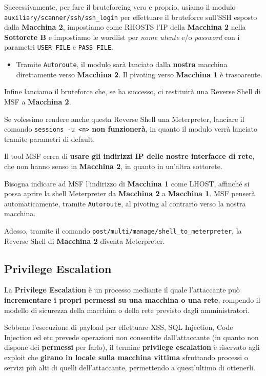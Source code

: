 \documentclass{article}
\begin{document}
Successivamente, per fare il bruteforcing vero e proprio, usiamo il modulo \verb|auxiliary/scanner/ssh/ssh_login| per effettuare il bruteforce sull'SSH esposto dalla \textbf{Macchina 2}, impostiamo come RHOSTS l'IP della \textbf{Macchina 2} nella \textbf{Sottorete B} e impostiamo le wordlist per \textit{nome utente} e/o \textit{password} con i parametri
\verb|USER_FILE| e \verb|PASS_FILE|.
\begin{itemize}
	\item Tramite \verb|Autoroute|, il modulo sarà lanciato dalla \textbf{nostra} macchina direttamente verso \textbf{Macchina 2}. Il pivoting verso \textbf{Macchina 1} è trasoarente.
\end{itemize}

Infine lanciamo il bruteforce che, se ha successo, ci restituirà una Reverse Shell di MSF a \textbf{Macchina 2}.

Se volessimo rendere anche questa Reverse Shell una Meterpreter, lanciare il comando \verb|sessions -u <n>| \textbf{non funzionerà}, in quanto il modulo verrà lanciato tramite parametri di default.

Il tool MSF cerca di \textbf{usare gli indirizzi IP delle nostre interfacce di rete}, che non hanno senso in \textbf{Macchina 2}, in quanto in un'altra sottorete.

Bisogna indicare ad MSF l'indirizzo di \textbf{Macchina 1} come LHOST, affinché si possa aprire la shell Meterpreter da \textbf{Macchina 2} a \textbf{Macchina 1}. MSF penserà automaticamente, tramite \verb|Autoroute|, al pivoting al contrario verso la nostra macchina.

Adesso, tramite il comando \verb|post/multi/manage/shell_to_meterpreter|, la Reverse Shell di \textbf{Macchina 2} diventa Meterpreter.

\newpage

\subsection{Privilege Escalation}
La \textbf{Privilege Escalation} è un processo mediante il quale l’attaccante può \textbf{incrementare i propri permessi su una macchina o una rete}, rompendo il modello di sicurezza della macchina o della rete previsto dagli amministratori.

Sebbene l'esecuzione di payload per effettuare XSS, SQL Injection, Code Injection ed etc prevede operazioni non consentite dall'attaccante (in quanto non dispone dei \textbf{permessi} per farlo), il termine \textbf{privilege escalation} è riservato agli exploit che \textbf{girano in locale sulla macchina vittima} sfruttando processi o servizi più alti di quelli dell'attaccante, permettendo a quest'ultimo di ottenerli.
\end{document}
